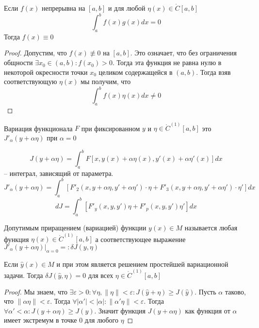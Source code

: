 \documentclass[document.tex]{subfiles}
\begin{document}
\begin{lemma}
    Если $f(x)$ непрерывна на $[a, b]$ и для любой $\eta(x) \in \mathring{C}[a, b]$
    \[
        \int_{a}^{b}f(x)g(x)dx = 0
    \]
    Тогда $f(x) \equiv 0$
\end{lemma}
\begin{proof}
    Допустим, что $f(x) \not \equiv 0$ на $[a, b]$. Это означает, что без ограничения общности
    $\exists x_0 \in (a, b): f(x_0) > 0$. Тогда эта функция не равна нулю в некоторой окресности точки $x_0$ целиком
    содержащейся в $(a, b)$. Тогда взяв соответствующую $\eta(x)$ мы получим, что
    \[
        \int_{a}^{b}f(x)\eta(x)dx \neq 0
    \]
\end{proof}

\begin{definition}
    Вариация функционала $F$ при фиксированном $y$ и $\eta \in \mathring{C}^{(1)}[a, b]$ это $J'_{\alpha}(y + \alpha
    \eta)$ при $\alpha = 0$
\end{definition}
\[
    J(y + \alpha \eta) = \int_{a}^{b} F[x, y(x) + \alpha \eta(x), y'(x) + \alpha \eta'(x)] dx
\] -- интеграл, зависящий от параметра.
\[
    J'_{\alpha}(y + \alpha \eta) = \int_{a}^{b}\left[ F'_{2}(x, y + \alpha \eta, y' + \alpha \eta') \cdot \eta + F'_{3}(x, y +
    \alpha \eta, y' + \alpha \eta') \cdot \eta' \right] dx
\]
\[
    dJ = \int_{a}^{b} \left[ F'_{y}(x, y, y') \eta + F'_{p}(x, y, y') \eta' \right] dx
\]

\begin{definition}
    Допутимым приращением (вариацией) функции $y(x) \in M$ называется любая функция $\eta(x) \in \mathring{C}^{(1)}[a,
    b]$ а соответствующее выражение $J'_{\alpha}(y + \alpha \eta) \Big|_{\alpha = 0} =: \delta J(y, \eta)$
\end{definition}

\begin{theorem}
    Если $\hat y(x) \in M$ и при этом является решением простейшей вариационной задачи. Тогда $\delta J(\hat y, \eta) =
    0$ для всех $\eta \in \mathring{C}^{(1)}[a, b]$
\end{theorem}

\begin{proof}
    Мы знаем, что $\exists \varepsilon > 0: \forall \eta, \|\eta\| < \varepsilon: J(\hat y + \eta) \geq J(\hat y)$.
    Пусть $\alpha$ таково, что $\| \alpha \eta \| < \varepsilon$. Тогда $\forall |\alpha'| < |\alpha|: \|\alpha' \eta \|
    < \varepsilon$. Тогда $\forall \alpha' < \alpha: J(y + \alpha \eta) \geq J(y)$. Значит функция $J(y + \alpha \eta)$
    как функция от $\alpha$ имеет экстремум в точке $0$ для любого $\eta$
\end{proof}
\end{document}
